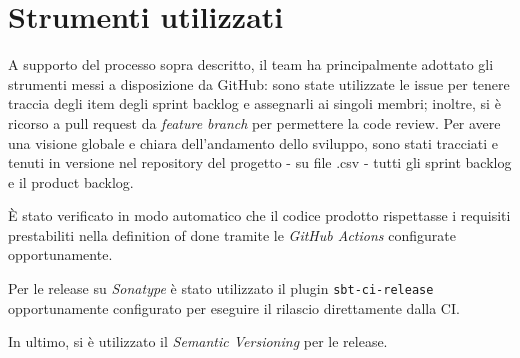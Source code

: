 \section{Strumenti utilizzati}\label{sec:strumenti-utilizzati}
A supporto del processo sopra descritto, il team ha principalmente adottato gli strumenti messi a disposizione da
GitHub: sono state utilizzate le issue per tenere traccia degli item degli sprint backlog e assegnarli ai singoli
membri;
inoltre, si è ricorso a pull request da \textit{feature branch} per permettere la code review.
Per avere una visione globale e chiara dell'andamento dello sviluppo, sono stati tracciati e tenuti in versione nel
repository del progetto - su file .csv - tutti gli sprint backlog e il product backlog.

È stato verificato in modo automatico che il codice prodotto rispettasse i requisiti prestabiliti nella
definition of done tramite le \textit{GitHub Actions} configurate opportunamente.

Per le release su \textit{Sonatype} è stato utilizzato il plugin \texttt{sbt-ci-release}~\cite{sbt-ci-release}
opportunamente configurato per eseguire il rilascio direttamente dalla CI\@.

In ultimo, si è utilizzato il \textit{Semantic Versioning} per le release.
